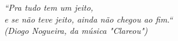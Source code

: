 \begin{epigrafe}
    \vspace*{\fill}
	\begin{flushright}

		\textit{``Pra tudo tem um jeito, \\
		e se não teve jeito, ainda não chegou ao fim.`` \\
		(Diogo Nogueira, da música "Clareou")}
	\end{flushright}
\end{epigrafe}
